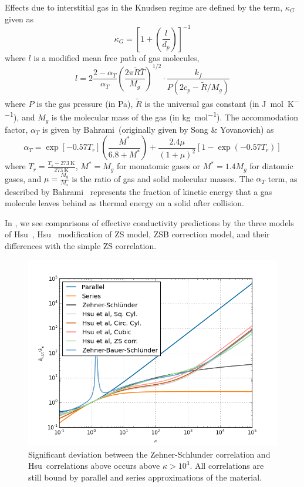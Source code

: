 Effects due to interstitial gas in the Knudsen regime are defined by the term, $\kappa_G$ given as
\begin{equation}
    \kappa_G = \left[1 + \left(\frac{l}{d_p}\right)\right]^{-1}
\end{equation}
where $l$ is a modified mean free path of gas molecules,
\begin{equation}
    l = 2\frac{2-\alpha_T}{\alpha_T}\left(\frac{2\pi\tilde{R}\bar{T}}{M_g}\right)^{1/2}\cdot\frac{k_f}{P(2c_p - \tilde{R}/M_g)}
\end{equation}
where $P$ is the gas pressure (in \si{\pascal}), $\tilde{R}$ is the universal gas constant (in \si{\joule\per\mol\per\kelvin}), and $M_g$ is the molecular mass of the gas (in \si{\kilo\gram\per\mol}). The accommodation factor, $\alpha_T$ is given by Bahrami\etal~(originally given by Song \& Yovanovich) as \cite{Bahrami20063691,song1988relative}
\begin{equation}
    \alpha_T = \exp\left[-0.57T_r\right]\left(\frac{M^*}{6.8+M^*}\right) + \frac{2.4\mu}{(1+\mu)^2}\left[1-\exp\left(-0.57T_r\right)\right]
\end{equation}
where $T_r = \frac{T_s-\SI{273}{\kelvin}}{\SI{273}{\kelvin}}$, $M^* = M_g$ for monatomic gases or $M^* = 1.4M_g$ for diatomic gases, and $\mu = \frac{M_g}{M_s}$ is the ratio of gas and solid molecular masses. The $\alpha_T$ term, as described by Bahrami\etal~ represents the fraction of kinetic energy that a gas molecule leaves behind as thermal energy on a solid after collision.

In , we see comparisons of effective conductivity predictions by the three models of Hsu\etal~, Hsu\etal~ modification of ZS model, ZSB correction model, and their differences with the simple ZS correlation.

\begin{figure}[!h]
    \centering
    \includegraphics[width=\textwidth]{figures/keff-kappa-series-parallel-zs-hsus}
    \caption{Significant deviation between the Zehner-Schlunder correlation and Hsu\etal~correlations above occurs above $\kappa > 10^3$. All correlations are still bound by parallel and series approximations of the material.}
    \label{fig:kappa-series-parallel-zs-hsus}
\end{figure}


